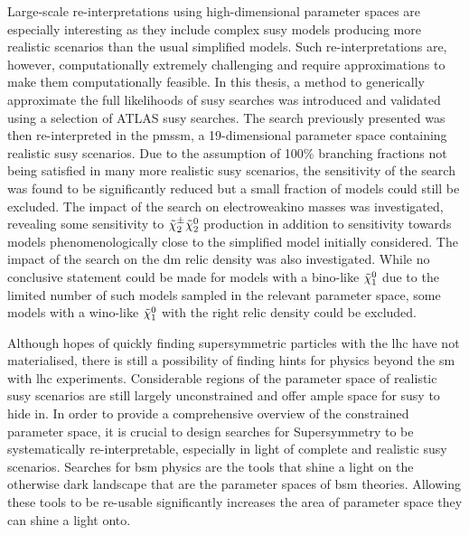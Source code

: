 Large-scale re-interpretations using high-dimensional parameter spaces are especially interesting as they include complex \gls{susy} models producing more realistic scenarios than the usual simplified models. Such re-interpretations are, however, computationally extremely challenging and require approximations to make them computationally feasible. In this thesis, a method to generically approximate the full likelihoods of \gls{susy} searches was introduced and validated using a selection of ATLAS \gls{susy} searches. The search previously presented was then re-interpreted in the \gls{pmssm}, a 19-dimensional parameter space containing realistic \gls{susy} scenarios. Due to the assumption of 100\% branching fractions not being satisfied in many more realistic \gls{susy} scenarios, the sensitivity of the \onelepton search was found to be significantly reduced but a small fraction of models could still be excluded. The impact of the \onelepton search on electroweakino masses was investigated, revealing some sensitivity to $\tilde{\chi}_2^\pm\tilde{\chi}_2^0$ production in addition to sensitivity towards models phenomenologically close to the simplified model initially considered. The impact of the \onelepton search on the \gls{dm} relic density was also investigated. While no conclusive statement could be made for models with a bino-like $\tilde{\chi}_1^0$ due to the limited number of such models sampled in the relevant parameter space, some models with a wino-like $\tilde{\chi}_1^0$ with the right relic density could be excluded. 
 
 Although hopes of quickly finding supersymmetric particles with the \gls{lhc} have not materialised, there is still a possibility of finding hints for physics beyond the \gls{sm} with \gls{lhc} experiments. Considerable regions of the parameter space of realistic \gls{susy} scenarios are still largely unconstrained and offer ample space for \gls{susy} to hide in. In order to provide a comprehensive overview of the constrained parameter space, it is crucial to design searches for Supersymmetry to be systematically re-interpretable, especially in light of complete and realistic \gls{susy} scenarios. Searches for \gls{bsm} physics are the tools that shine a light on the otherwise dark landscape that are the parameter spaces of \gls{bsm} theories. Allowing these tools to be re-usable significantly increases the area of parameter space they can shine a light onto.    
 